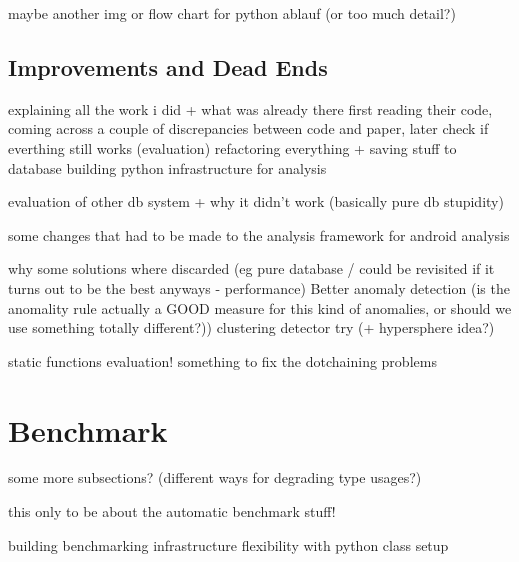 maybe another img or flow chart for python ablauf (or too much detail?)

\subsection{Improvements and Dead Ends}

explaining all the work i did + what was already there
    first reading their code, coming across a couple of discrepancies between code and paper, later check if everthing still works (evaluation)
    refactoring everything + saving stuff to database
    building python infrastructure for analysis

evaluation of other db system + why it didn't work (basically pure db stupidity)

some changes that had to be made to the analysis framework for android analysis

why some solutions where discarded (eg pure database / could be revisited if it turns out to be the best anyways - performance)
Better anomaly detection (is the anomality rule actually a GOOD measure for this kind of anomalies, or should we use something totally different?))
    clustering detector try (+ hypersphere idea?)

static functions evaluation!
something to fix the dotchaining problems

\section{Benchmark}
some more subsections? (different ways for degrading type usages?)

this only to be about the automatic benchmark stuff!

building benchmarking infrastructure
flexibility with python class setup
